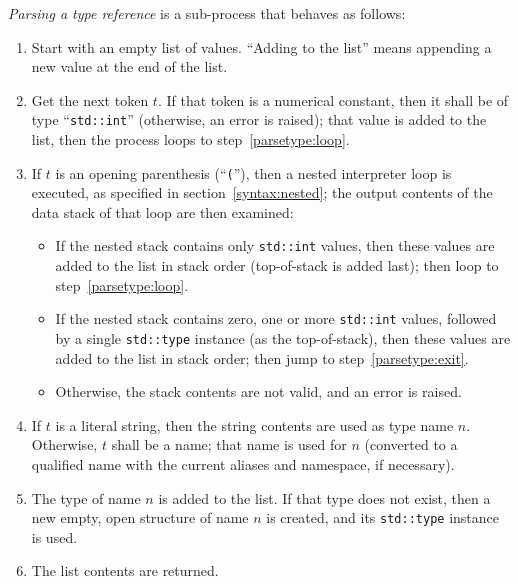 \emph{Parsing a type reference} is a sub-process that behaves as
follows:
\begin{enumerate}

    \item Start with an empty list of values. ``Adding to the list'' means
    appending a new value at the end of the list.

    \item \label{parsetype:loop}Get the next token $t$. If that token
    is a numerical constant, then it shall be of type ``\verb|std::int|''
    (otherwise, an error is raised); that value is added to the list,
    then the process loops to step~\ref{parsetype:loop}.

    \item If $t$ is an opening parenthesis (``\verb|(|''), then a
    nested interpreter loop is executed, as specified in
    section~\ref{syntax:nested}; the output contents of the data stack
    of that loop are then examined:
    \begin{itemize}

        \item If the nested stack contains only \verb|std::int| values,
        then these values are added to the list in stack order
        (top-of-stack is added last); then loop to
        step~\ref{parsetype:loop}.

        \item If the nested stack contains zero, one or more
        \verb|std::int| values, followed by a single \verb|std::type|
        instance (as the top-of-stack), then these values are added to
        the list in stack order; then jump to step~\ref{parsetype:exit}.

        \item Otherwise, the stack contents are not valid, and an
        error is raised.

    \end{itemize}

    \item If $t$ is a literal string, then the string contents are used
    as type name $n$. Otherwise, $t$ shall be a name; that name is used
    for $n$ (converted to a qualified name with the current aliases and
    namespace, if necessary).

    \item The type of name $n$ is added to the list. If that type does
    not exist, then a new empty, open structure of name $n$ is created,
    and its \verb|std::type| instance is used.

    \item \label{parsetype:exit}The list contents are returned.

\end{enumerate}

